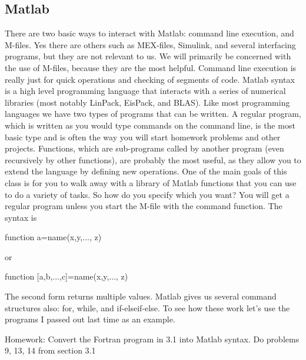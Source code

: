 \subsection{Matlab}
There are two basic ways to interact with Matlab: command line execution, and M-files. Yes there are others such as MEX-files, Simulink, and several interfacing programs, but they are not relevant to us.  We will primarily be concerned with the use of M-files, because they are the most helpful.  Command line execution is really just for quick operations and checking of segments of code.  Matlab syntax is a high level programming language that interacts with a series of numerical libraries (most notably LinPack, EisPack, and BLAS).  Like most programming languages we have two types of programs that can be written.  A regular program, which is written as you would type commands on the command line, is the most basic type and is often the way you will start homework problems and other projects.  Functions, which are sub-programs called by another program (even recursively by other functions), are probably the most useful, as they allow you to extend the language by defining new operations.  One of the main goals of this class is for you to walk away with a library of Matlab functions that you can use to do a variety of tasks.  So how do you specify which you want?  You will get a regular program unless you start the M-file with the command function.  The syntax is

function a=name(x,y,..., z)

or

function [a,b,...,c]=name(x,y,..., z)

The second form returns multiple values.  Matlab gives us several command structures also: for, while, and if-elseif-else.  To see how these work let's use the programs I passed out last time as an example.

Homework:
Convert the Fortran program in 3.1 into Matlab syntax.
Do problems 9, 13, 14 from section 3.1
